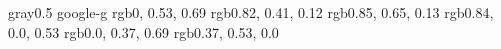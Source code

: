\usepackage{listings}







%
%
%


\definecolor{hsk-comment}   {gray}{0.5}
    {google-g}
\definecolor{hsk-types}        {rgb}{0, 0.53, 0.69}
\definecolor{hsk-typevar}      {rgb}{0.82, 0.41, 0.12}
\definecolor{hsk-constructors} {rgb}{0.85, 0.65, 0.13}
\definecolor{hsk-operators}    {rgb}{0.84, 0.0, 0.53}
\definecolor{hsk-keywords}     {rgb}{0.0, 0.37, 0.69}
\definecolor{hsk-strings}      {rgb}{0.37, 0.53, 0.0}

